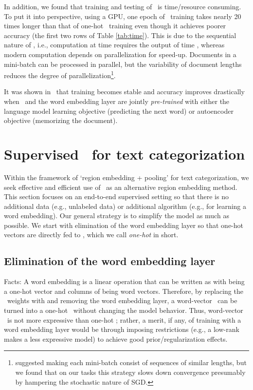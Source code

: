 \documentclass{article}
\begin{document}
In addition, we found that training and testing of \wvLstm\ is time/resource consuming. 
To put it into perspective, using a GPU, one epoch of \wvLstm\ training 
takes nearly 20 times longer than that of one-hot \cnn\ training even though it achieves poorer accuracy 
(the first two rows of Table \ref{tab:time}). 
This is due to the sequential nature of \lstm, i.e., computation at time  requires the output of time , 
whereas modern computation depends on parallelization for speed-up.  
Documents in a mini-batch can be processed in parallel, but the variability of document lengths 
reduces the degree of parallelization\footnote{
  \cite{SVL14} suggested making each mini-batch consist of sequences of similar lengths, but we found that on our tasks 
  this strategy slows down convergence presumably by hampering the stochastic nature of SGD. 
}. 


It was shown in \DLa\ that training becomes stable and accuracy improves drastically 
when \lstm\ and the word embedding layer are jointly {\em pre-trained} with either the language model learning 
objective (predicting the next word) or autoencoder objective (memorizing the document).  

\section{Supervised \lstm\ for text categorization}
\label{sec:sup}

Within the framework of `region embedding + pooling' for text categorization, 
we seek effective and efficient use of \lstm\ as an alternative region embedding method. 
This section focuses on an end-to-end supervised setting so that 
there is no additional data (e.g., unlabeled data) or additional algorithm (e.g., for learning a word embedding). 
Our general strategy is to simplify the model as much as possible. 
We start with 
elimination of the word embedding layer  
so that one-hot vectors are directly fed to \lstm, 
which we call {\em one-hot \lstm} in short.  


\subsection{Elimination of the word embedding layer} 
\label{sec:onehot}
\newcommand{\wordW}{{\mathbf V}}
Facts: A word embedding is a linear operation that can be written as  
with  being a one-hot vector and columns of  being word vectors.  
Therefore, 
by replacing the \lstm\ weights  with  and removing the word embedding layer, 
a word-vector \lstm\ can be turned into a one-hot \lstm\ without changing the model behavior.  
Thus, word-vector \lstm\ is not more expressive than one-hot \lstm; rather, 
a merit, if any, of 
training with a word embedding layer would be through imposing restrictions
(e.g., a low-rank  makes a less expressive model) 
to achieve good prior/regularization effects. 
\end{document}
